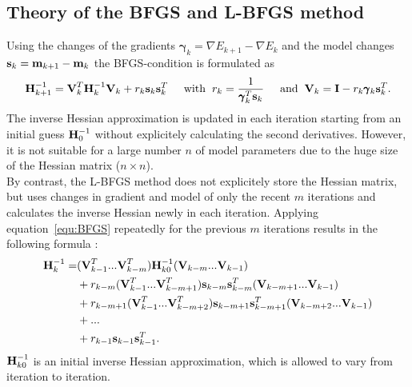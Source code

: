 \subsection{Theory of the BFGS and L-BFGS method}
Using the changes of the gradients $\pmb{\gamma}_k=\nabla E_{k+1}-\nabla E_{k}$ and the model changes $\textbf s_k=\textbf{m}_{k+1}-\textbf{m}_{k}$ the BFGS-condition is formulated as \citep{Noc99}
\begin{equation}
 \textbf{H}_{k+1}^{-1}=\textbf V_k^T\textbf H_k^{-1}\textbf V_k+r_k\textbf s_k\textbf s_k^T \hspace{0.5cm} \text{with} \hspace{0.2cm} r_k=\frac{1}{\pmb{\gamma}_k^T\textbf s_k}  \hspace{0.5cm} \text{and} \hspace{0.2cm}\textbf V_k=\textbf I-r_k\pmb{\gamma}_k\textbf s_k^T.\label{equ:BFGS}
\end{equation}
The inverse Hessian approximation is updated in each iteration starting from an initial guess $\textbf H_0^{-1}$ without explicitely calculating the second derivatives. However, it is not suitable for a large number $n$ of model parameters due to the huge size of the Hessian matrix ($n\times n$).\\
By contrast, the L-BFGS method does not explicitely store the Hessian matrix, but uses changes in gradient and model of only the recent $m$ iterations and calculates the inverse Hessian newly in each iteration. Applying equation~\ref{equ:BFGS} repeatedly for the previous $m$ iterations results in the following formula \citep{Noc99}:
\begin{equation}
 \begin{split}
  \textbf H_k^{-1}=& (\textbf V_{k-1}^T...\textbf V_{k-m}^T)\textbf H_{k0}^{-1}(\textbf V_{k-m}...\textbf V_{k-1})\\
      & +r_{k-m}(\textbf V_{k-1}^T...\textbf V_{k-m+1}^T)\textbf s_{k-m}\textbf s_{k-m}^T(\textbf V_{k-m+1}...\textbf V_{k-1})\\
      & +r_{k-m+1}(\textbf V_{k-1}^T...\textbf V_{k-m+2}^T)\textbf s_{k-m+1}\textbf s_{k-m+1}^T(\textbf V_{k-m+2}...\textbf V_{k-1})\\
      & +... \\
      & +r_{k-1}\textbf s_{k-1}\textbf s_{k-1}^T.
 \end{split}\label{equ:LBFGS}
\end{equation}
$\textbf H_{k0}^{-1}$ is an initial inverse Hessian approximation, which is allowed to vary from iteration to iteration.
